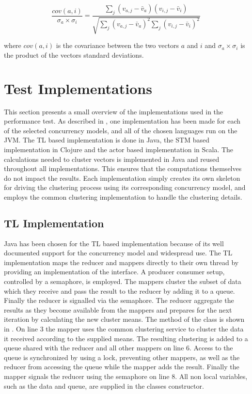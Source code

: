 \begin{equation}\label{pearsonverbose}
\frac{cov(a,i)}{\sigma_a \times \sigma_i} = \frac{\sum_j(v_{a,j}-\bar{v}_a)(v_{i,j}-\bar{v}_i)}{\sqrt{{\sum_j}(v_{a,j}-\bar{v}_a)^2 \sum_j(v_{i,j}-\bar{v}_i)^2}}
\end{equation}

where $cov(a,i)$ is the covariance between the two vectors $a$ and $i$ and $\sigma_a \times \sigma_i$ is the product of the vectors standard deviations. 
\section{Test Implementations}
This section presents a small overview of the implementations used in the performance test. As described in , one implementation has been made for each of the selected concurrency models, and all of the chosen languages run on the \ac{JVM}. The \ac{TL} based implementation is done in Java, the \ac{STM} based implementation in Clojure and the actor based implementation in Scala. The calculations needed to cluster vectors is implemented in Java and reused throughout all implementations. This ensures that the computations themselves do not impact the results. Each implementation simply creates its own skeleton for driving the clustering process using its corresponding concurrency model, and employs the common clustering implementation to handle the clustering details.

\subsection{\ac{TL} Implementation}
Java has been chosen for the \ac{TL} based implementation because of its well documented support for the concurrency model and widespread use. The \ac{TL} implementation maps the reducer and mappers directly to their own thread by providing an implementation of the  interface. A producer consumer setup, controlled by a semaphore, is employed. The mappers cluster the subset of data which they receive and pass the result to the reducer by adding it to a queue. Finally the reducer is signalled via the semaphore. The reducer aggregate the results as they become available from the mappers  and prepares for the next iteration by calculating the new cluster means. The  method of the  class is shown in . On line 3 the mapper uses the common clustering service to cluster the data it received according to the supplied means. The resulting clustering is added to a queue shared with the reducer and all other mappers on line 6. Access to the queue is synchronized by using a lock, preventing other mappers, as well as the reducer from accessing the queue while the mapper adds the result. Finally the mapper signals the reducer using the semaphore on line 8. All non local variables, such as the data and queue, are supplied in the  classes constructor.

